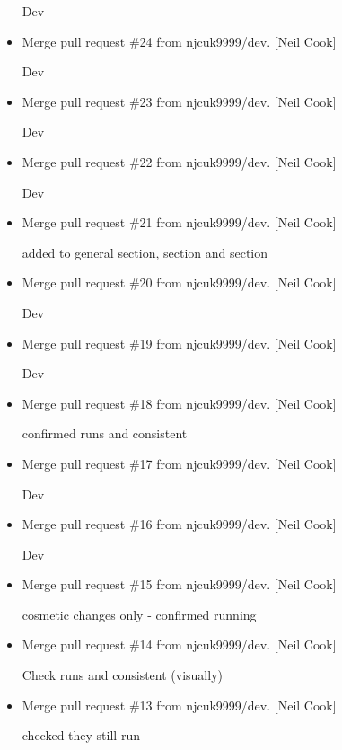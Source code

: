 \documentclass[a4paper,10pt,english]{report}
\begin{document}
\begin{itemize}
Dev

\item {} 
Merge pull request \#24 from njcuk9999/dev. {[}Neil Cook{]}

Dev

\item {} 
Merge pull request \#23 from njcuk9999/dev. {[}Neil Cook{]}

Dev

\item {} 
Merge pull request \#22 from njcuk9999/dev. {[}Neil Cook{]}

Dev

\item {} 
Merge pull request \#21 from njcuk9999/dev. {[}Neil Cook{]}

added to general section,  section and  section

\item {} 
Merge pull request \#20 from njcuk9999/dev. {[}Neil Cook{]}

Dev

\item {} 
Merge pull request \#19 from njcuk9999/dev. {[}Neil Cook{]}

Dev

\item {} 
Merge pull request \#18 from njcuk9999/dev. {[}Neil Cook{]}

confirmed runs and consistent

\item {} 
Merge pull request \#17 from njcuk9999/dev. {[}Neil Cook{]}

Dev

\item {} 
Merge pull request \#16 from njcuk9999/dev. {[}Neil Cook{]}

Dev

\item {} 
Merge pull request \#15 from njcuk9999/dev. {[}Neil Cook{]}

cosmetic changes only - confirmed running

\item {} 
Merge pull request \#14 from njcuk9999/dev. {[}Neil Cook{]}

Check runs and consistent (visually)

\item {} 
Merge pull request \#13 from njcuk9999/dev. {[}Neil Cook{]}

checked they still run


\end{itemize}
\end{document}

